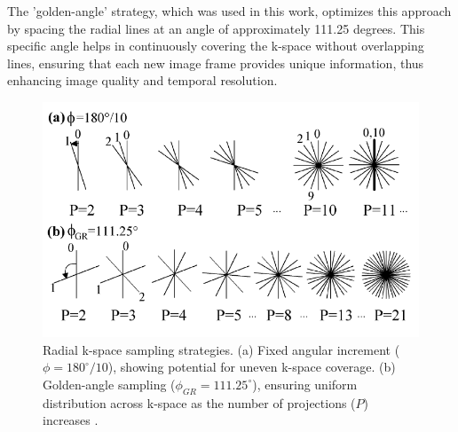 \documentclass{micro-econ-thesis}
\begin{document}
 The 'golden-angle' strategy, which was used in this work, optimizes this approach by spacing the radial lines at an angle of approximately 111.25 degrees. This specific angle helps in continuously covering the k-space without overlapping lines, ensuring that each new image frame provides unique information, thus enhancing image quality and temporal resolution. 
 
\begin{figure}[H]
	\centering
	\includegraphics[width=0.7\linewidth]{golden_angle_figure}
	\caption{Radial k-space sampling strategies. (a) Fixed angular increment ($\phi = 180^\circ / 10$), showing potential for uneven k-space coverage. (b) Golden-angle sampling ($\phi_{GR} = 111.25^\circ$), ensuring uniform distribution across k-space as the number of projections ($P$) increases \parencite{winkelmann_optimal_2007}.}
	\label{fig:goldenanglefigure}
\end{figure}
\end{document}
